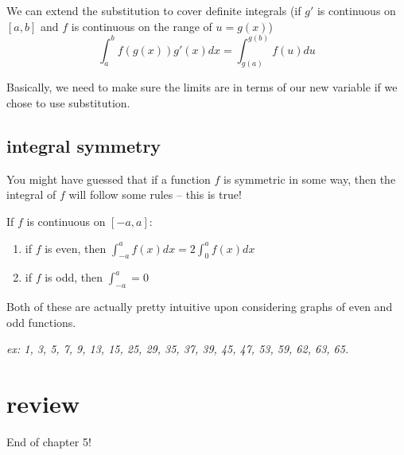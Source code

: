 \documentclass[10pt,a4paper]{report}
\begin{document}
We can extend the substitution to cover definite integrals (if $g'$ is continuous on $[a, b]$ and $f$ is continuous on the range of $u = g(x)$)
$$
	\int_a^b f(g(x))g'(x)dx = \int_{g(a)}^{g(b)} f(u) du
$$

Basically, we need to make sure the limits are in terms of our new variable if we chose to use substitution.

\subsection{integral symmetry}

You might have guessed that if a function $f$ is symmetric in some way, then the integral of $f$ will follow some rules -- this is true!

If $f$ is continuous on $[-a, a]$:

\begin{enumerate}
	\item if $f$ is even, then $\int_{-a}^{a} f(x)dx = 2 \int_0^a f(x) dx$
	\item if $f$ is odd, then $\int_{-a}^a = 0$
\end{enumerate}

Both of these are actually pretty intuitive upon considering graphs of even and odd functions.

\emph{ex: 1, 3, 5, 7, 9, 13, 15, 25, 29, 35, 37, 39, 45, 47, 53, 59, 62, 63, 65.}

\section*{review}

End of chapter 5!
\end{document}
